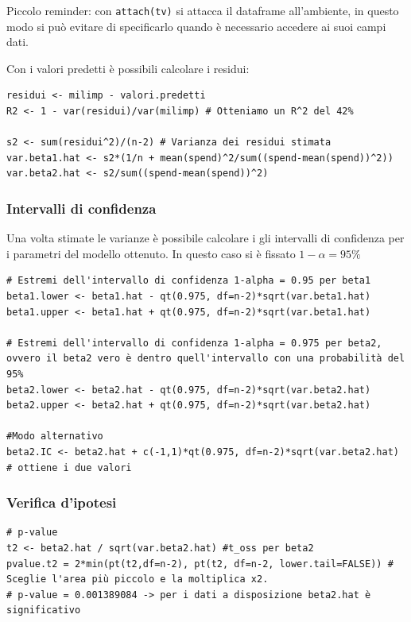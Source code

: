 Piccolo reminder: con \texttt{attach(tv)} si attacca il dataframe all'ambiente, in questo modo si può evitare di specificarlo quando è necessario accedere ai suoi campi dati.

Con i valori predetti è possibili calcolare i residui:
\begin{lstlisting}
residui <- milimp - valori.predetti
R2 <- 1 - var(residui)/var(milimp) # Otteniamo un R^2 del 42%

s2 <- sum(residui^2)/(n-2) # Varianza dei residui stimata
var.beta1.hat <- s2*(1/n + mean(spend)^2/sum((spend-mean(spend))^2))
var.beta2.hat <- s2/sum((spend-mean(spend))^2)
\end{lstlisting}

\subsubsection{Intervalli di confidenza}

Una volta stimate le varianze è possibile calcolare i gli intervalli di confidenza per i parametri del modello ottenuto. In questo caso si è fissato $ 1-\alpha = 95\% $

\begin{lstlisting}
# Estremi dell'intervallo di confidenza 1-alpha = 0.95 per beta1
beta1.lower <- beta1.hat - qt(0.975, df=n-2)*sqrt(var.beta1.hat)
beta1.upper <- beta1.hat + qt(0.975, df=n-2)*sqrt(var.beta1.hat)

# Estremi dell'intervallo di confidenza 1-alpha = 0.975 per beta2, ovvero il beta2 vero è dentro quell'intervallo con una probabilità del 95%
beta2.lower <- beta2.hat - qt(0.975, df=n-2)*sqrt(var.beta2.hat)
beta2.upper <- beta2.hat + qt(0.975, df=n-2)*sqrt(var.beta2.hat)

#Modo alternativo
beta2.IC <- beta2.hat + c(-1,1)*qt(0.975, df=n-2)*sqrt(var.beta2.hat) # ottiene i due valori
\end{lstlisting}

\subsubsection{Verifica d'ipotesi}

\begin{lstlisting}
# p-value
t2 <- beta2.hat / sqrt(var.beta2.hat) #t_oss per beta2
pvalue.t2 = 2*min(pt(t2,df=n-2), pt(t2, df=n-2, lower.tail=FALSE)) # Sceglie l'area più piccolo e la moltiplica x2.
# p-value = 0.001389084 -> per i dati a disposizione beta2.hat è significativo
\end{lstlisting}

